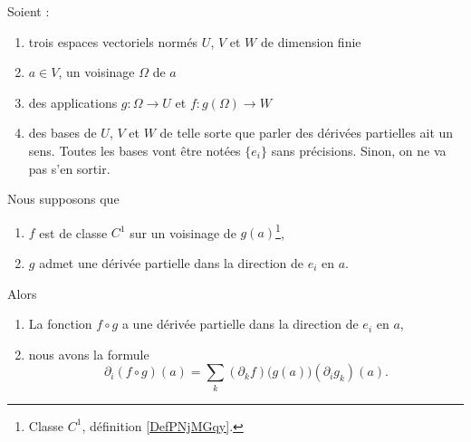 \begin{theorem}     \label{THOooKBTYooWFtoSF}
	Soient :
	\begin{enumerate}
		\item
		      trois espaces vectoriels normés \( U\), \( V\) et \( W\) de dimension finie
		\item
		      \( a\in V\), un voisinage \( \Omega\) de \( a\)
		\item
		      des applications \( g\colon \Omega\to U\) et \( f\colon g(\Omega)\to W\)
		\item
		      des bases de \( U\), \( V\) et \( W\) de telle sorte que parler des dérivées partielles ait un sens. Toutes les bases vont être notées \( \{ e_i \}\) sans précisions. Sinon, on ne va pas s'en sortir.
	\end{enumerate}
	Nous supposons que
	\begin{enumerate}
		\item
		      \( f\) est de classe \( C^1\) sur un voisinage de \( g(a)\)\footnote{Classe \( C^1\), définition \ref{DefPNjMGqy}.},
		\item
		      \( g\) admet une dérivée partielle dans la direction de \( e_i\) en \( a\).
	\end{enumerate}
	Alors
	\begin{enumerate}
		\item
		      La fonction \( f\circ g\) a une dérivée partielle dans la direction de \( e_i\) en \( a\),
		\item
		      nous avons la formule
		      \begin{equation}        \label{EQooZMAUooIusxgD}
			      \partial_i(f\circ g)(a)=\sum_{k}(\partial_kf)\big( g(a) \big)(\partial_ig_k)(a).
		      \end{equation}
	\end{enumerate}
\end{theorem}

